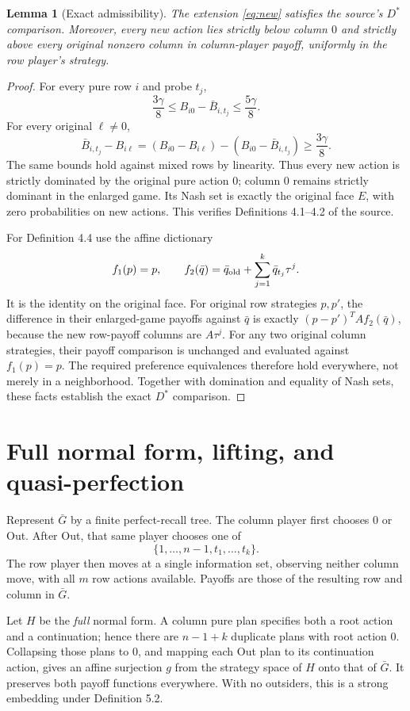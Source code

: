 \documentclass[11pt]{article}
\newtheorem{lemma}[theorem]{Lemma}
\theoremstyle{definition}
\theoremstyle{remark}
\begin{document}
\begin{lemma}[Exact admissibility]\label{lem:admissible}
The extension \eqref{eq:new} satisfies the source's $D^*$ comparison.
Moreover, every new action lies strictly below column $0$ and strictly
above every original nonzero column in column-player payoff, uniformly
in the row player's strategy.
\end{lemma}
\begin{proof}
For every pure row $i$ and probe $t_j$,
\[
 \frac{3\gamma}{8}\le B_{i0}-\bar B_{i,t_j}
                       \le\frac{5\gamma}{8}.
\]
For every original $\ell\ne0$,
\[
 \bar B_{i,t_j}-B_{i\ell}
 =(B_{i0}-B_{i\ell})-(B_{i0}-\bar B_{i,t_j})
 \ge\frac{3\gamma}{8}.
\]
The same bounds hold against mixed rows by linearity. Thus every new
action is strictly dominated by the original pure action $0$; column
$0$ remains strictly dominant in the enlarged game. Its Nash set is
exactly the original face $E$, with zero probabilities on new actions.
This verifies Definitions 4.1--4.2 of the source.

For Definition 4.4 use the affine dictionary
\[
 f_1(p)=p,\qquad
 f_2(\bar q)=\bar q_{\rm old}+\sum_{j=1}^k\bar q_{t_j}\tau^j.
\]
It is the identity on the original face. For original row strategies
$p,p'$, the difference in their enlarged-game payoffs against $\bar q$
is exactly $(p-p')^TAf_2(\bar q)$, because the new row-payoff columns
are $A\tau^j$. For any two original column strategies, their payoff
comparison is unchanged and evaluated against $f_1(p)=p$.
The required preference equivalences therefore hold everywhere, not
merely in a neighborhood. Together with domination and equality of
Nash sets, these facts establish the exact $D^*$ comparison.
\end{proof}


\section{Full normal form, lifting, and quasi-perfection}
Represent $\bar G$ by a finite perfect-recall tree. The column player
first chooses $0$ or Out. After Out, that same player chooses one of
\[
 \{1,\ldots,n-1,t_1,\ldots,t_k\}.
\]
The row player then moves at a single information set, observing neither
column move, with all $m$ row actions available. Payoffs are those of the
resulting row and column in $\bar G$.

Let $H$ be the \emph{full} normal form. A column pure plan specifies
both a root action and a continuation; hence there are
$n-1+k$ duplicate plans with root action $0$. Collapsing those plans
to $0$, and mapping each Out plan to its continuation action, gives an
affine surjection $g$ from the strategy space of $H$ onto that of
$\bar G$. It preserves both payoff functions everywhere. With no
outsiders, this is a strong embedding under Definition 5.2.
\end{document}
